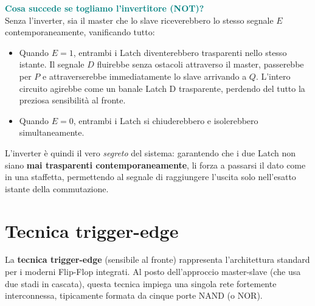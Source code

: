 \documentclass[11pt,a4paper]{report}
\begin{document}
\medskip
\noindent\textcolor{teal}{\textbf{Cosa succede se togliamo l'invertitore (NOT)?}}\\
Senza l'inverter, sia il master che lo slave riceverebbero lo stesso segnale $E$ contemporaneamente, vanificando tutto:
\begin{itemize}[leftmargin=1.5em,itemsep=2pt]
  \item Quando $E=1$, entrambi i Latch diventerebbero trasparenti nello stesso istante. Il segnale $D$ fluirebbe senza ostacoli attraverso il master, passerebbe per $P$ e attraverserebbe immediatamente lo slave arrivando a $Q$. L'intero circuito agirebbe come un banale Latch D trasparente, perdendo del tutto la preziosa sensibilità al fronte.
  \item Quando $E=0$, entrambi i Latch si chiuderebbero e isolerebbero simultaneamente.
\end{itemize}
L'inverter è quindi il vero \emph{segreto} del sistema: garantendo che i due Latch non siano \textbf{mai trasparenti contemporaneamente}, li forza a passarsi il dato come in una staffetta, permettendo al segnale di raggiungere l'uscita solo nell'esatto istante della commutazione.


\section{Tecnica trigger-edge}

La \textbf{tecnica trigger-edge} (sensibile al fronte) rappresenta l'architettura standard per i moderni Flip-Flop integrati. Al posto dell'approccio master-slave (che usa due stadi in cascata), questa tecnica impiega una singola rete fortemente interconnessa, tipicamente formata da cinque porte NAND (o NOR).
\end{document}
